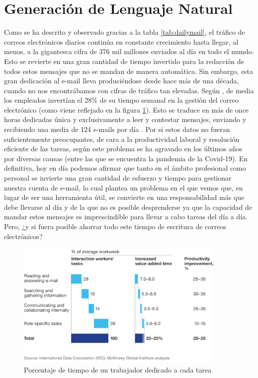 \section{Generación de Lenguaje Natural}\label{s:nlg}
Como se ha descrito y observado gracias a la tabla \ref{tab:dailymail}, el tráfico de correos electrónicos diarios continúa en constante crecimiento hasta llegar, al menos, a la gigantesca cifra de 376 mil millones enviados al día en todo el mundo. Esto se revierte en una gran cantidad de tiempo invertido para la redacción de todos estos mensajes que no se mandan de manera automática. Sin embargo, esta gran dedicación al e-mail lleva produciéndose desde hace más de una década, cuando no nos encontrábamos con cifras de tráfico tan elevadas. Según \cite{mckinsey}, de media los empleados invertían el 28\% de su tiempo semanal en la gestión del correo electrónico (como viene reflejado en la figura \ref{fig:e-mailwork}). Esto se traduce en más de once horas dedicadas única y exclusivamente a leer y contestar mensajes, enviando y recibiendo una media de 124 e-mails por día \citep{radicati2015email}. Por si estos datos no fueran suficientemente preocupantes, de cara a la productividad laboral y resolución eficiente de las tareas, según \cite{forbes} este problema se ha agravado en los últimos años por diversas causas (entre las que se encuentra la pandemia de la Covid-19). En definitiva, hoy en día podemos afirmar que tanto en el ámbito profesional como personal se invierte una gran cantidad de esfuerzo y tiempo para gestionar nuestra cuenta de e-mail, lo cual plantea un problema en el que vemos que, en lugar de ser una herramienta útil, se convierte en una responsabilidad más que debe llevarse al día y de la que no es posible desprenderse ya que la capacidad de mandar estos mensajes es imprescindible para llevar a cabo tareas del día a día. Pero, ¿y si fuera posible ahorrar todo este tiempo de escritura de correos electrónicos?

\begin{figure}[h]
	\centering%
	\centerline{\includegraphics[width = 0.9\textwidth]{Imagenes/Bitmap/mckinsey.png}}%
	\caption{Porcentaje de tiempo de un trabajador dedicado a cada tarea}%
	\label{fig:e-mailwork}
\end{figure}

